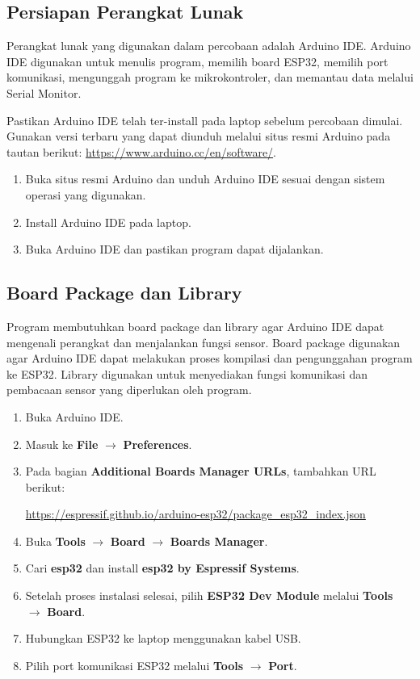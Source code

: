 \documentclass[12pt,a4paper]{article}
\begin{document}
\subsection{Persiapan Perangkat Lunak}

Perangkat lunak yang digunakan dalam percobaan adalah Arduino IDE. Arduino IDE digunakan untuk menulis program, memilih board ESP32, memilih port komunikasi, mengunggah program ke mikrokontroler, dan memantau data melalui Serial Monitor.

Pastikan Arduino IDE telah ter-install pada laptop sebelum percobaan dimulai. Gunakan versi terbaru yang dapat diunduh melalui situs resmi Arduino pada tautan berikut: \url{https://www.arduino.cc/en/software/}.

\begin{enumerate}
    \item Buka situs resmi Arduino dan unduh Arduino IDE sesuai dengan sistem operasi yang digunakan.
    \item Install Arduino IDE pada laptop.
    \item Buka Arduino IDE dan pastikan program dapat dijalankan.
\end{enumerate}

\subsection{Board Package dan Library}

Program membutuhkan board package dan library agar Arduino IDE dapat mengenali perangkat dan menjalankan fungsi sensor. Board package digunakan agar Arduino IDE dapat melakukan proses kompilasi dan pengunggahan program ke ESP32. Library digunakan untuk menyediakan fungsi komunikasi dan pembacaan sensor yang diperlukan oleh program.

\begin{enumerate}
    \item Buka Arduino IDE.
    \item Masuk ke \textbf{File} $\rightarrow$ \textbf{Preferences}.
    \item Pada bagian \textbf{Additional Boards Manager URLs}, tambahkan URL berikut:
    
    \url{https://espressif.github.io/arduino-esp32/package_esp32_index.json}
    
    \item Buka \textbf{Tools} $\rightarrow$ \textbf{Board} $\rightarrow$ \textbf{Boards Manager}.
    \item Cari \textbf{esp32} dan install \textbf{esp32 by Espressif Systems}.
    \item Setelah proses instalasi selesai, pilih \textbf{ESP32 Dev Module} melalui \textbf{Tools} $\rightarrow$ \textbf{Board}.    \item Hubungkan ESP32 ke laptop menggunakan kabel USB.
    \item Pilih port komunikasi ESP32 melalui \textbf{Tools} $\rightarrow$ \textbf{Port}.
\end{enumerate}
\end{document}
